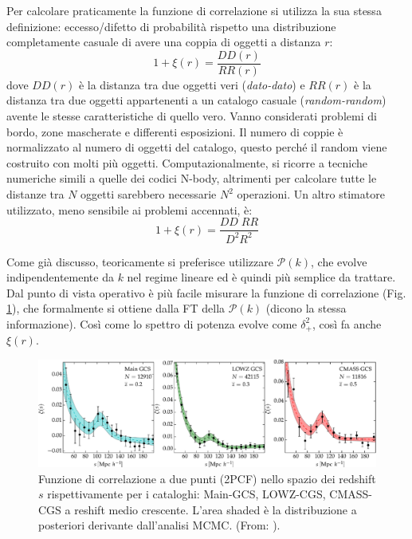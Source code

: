 \vspace{1em}
Per calcolare praticamente la funzione di correlazione si utilizza la sua stessa definizione: eccesso/difetto di probabilità rispetto una distribuzione completamente casuale di avere una coppia di oggetti a distanza $r$:
\begin{equation}
    1+\xi(r)=\frac{DD(r)}{RR(r)}            
\end{equation}
dove $DD(r)$ è la distanza tra due oggetti veri (\textit{dato-dato}) e $RR(r)$ è la distanza tra due oggetti appartenenti a un catalogo casuale (\textit{random-random}) avente le stesse caratteristiche di quello vero. Vanno considerati problemi di bordo, zone mascherate e differenti esposizioni. Il numero di coppie è normalizzato al numero di oggetti del catalogo, questo perché il random viene costruito con molti più oggetti. Computazionalmente, si ricorre a tecniche numeriche simili a quelle dei codici N-body, altrimenti per calcolare tutte le distanze tra $N$ oggetti sarebbero necessarie $N^2$ operazioni. Un altro stimatore utilizzato, meno sensibile ai problemi accennati, è:
\begin{equation}
    1+\xi(r)= \frac{DD\; RR}{D^2R^2}
\end{equation}

Come già discusso, teoricamente si preferisce utilizzare $\mathcal{P}(k)$, che evolve indipendentemente da $k$ nel regime lineare ed è quindi più semplice da trattare. Dal punto di vista operativo è più facile misurare la funzione di correlazione (Fig. \ref{fig10:2pcf}), che formalmente si ottiene dalla FT della $\mathcal{P}(k)$ (dicono la stessa informazione). Così come lo spettro di potenza evolve come $\delta_+^2$, così fa anche $\xi(r)$.

\begin{figure}[H]
    \centering
    \includegraphics[width=.95 \textwidth]{Pictures/10/2pcf.eps}
    \caption{Funzione di correlazione a due punti (2PCF) nello spazio dei redshift $s$ rispettivamente per i cataloghi: Main-GCS, LOWZ-CGS, CMASS-CGS a reshift medio crescente. L'area shaded è la distribuzione a posteriori derivante dall'analisi MCMC. (From: \cite{10.1093/mnras/stw306}).}\label{fig10:2pcf}
\end{figure}

